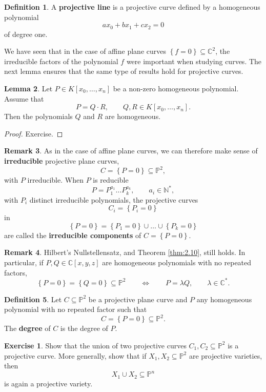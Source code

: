 \documentclass{article}
\newcommand{\N}{\mathbb{N}}
\newcommand{\C}{\mathbb{C}}
\renewcommand{\P}{\mathbb{P}}
\renewcommand{\sb}[1]{\left[ #1 \right]}
\newcommand{\cb}[1]{\left\{ #1 \right\}}
\theoremstyle{definition}\newtheorem{definition}{Definition}[section]
\theoremstyle{definition}\newtheorem{notation}[definition]{Notation}
\theoremstyle{definition}\newtheorem{remark}[definition]{Remark}
\theoremstyle{definition}\newtheorem{example1}[definition]{Example}
\theoremstyle{definition}\newtheorem{fact}{Fact}
\theoremstyle{definition}\newtheorem{exercise}{Exercise}
\theoremstyle{definition}\newtheorem*{example2}{Example}
\newtheorem{lemma}[definition]{Lemma}
\begin{document}
\begin{definition}
A \textbf{projective line} is a projective curve defined by a homogeneous polynomial
$$ ax_0 + bx_1 + cx_2 = 0 $$
of degree one.
\end{definition}

We have seen that in the case of affine plane curves $ \cb{f = 0} \subseteq \C^2 $, the irreducible factors of the polynomial $ f $ were important when studying curves. The next lemma ensures that the same type of results hold for projective curves.

\begin{lemma}
\label{lem:4.10}
Let $ P \in K\sb{x_0, \dots, x_n} $ be a non-zero homogeneous polynomial. Assume that
$$ P = Q \cdot R, \qquad Q, R \in K\sb{x_0, \dots, x_n}. $$
Then the polynomials $ Q $ and $ R $ are homogeneous.
\end{lemma}

\begin{proof}
Exercise.
\end{proof}

\begin{remark}
As in the case of affine plane curves, we can therefore make sense of \textbf{irreducible} projective plane curves,
$$ C = \cb{P = 0} \subseteq \P^2, $$
with $ P $ irreducible. When $ P $ is reducible
$$ P = P_1^{a_1} \dots P_k^{a_k}, \qquad a_i \in \N^*, $$
with $ P_i $ distinct irreducible polynomials, the projective curves
$$ C_i = \cb{P_i = 0} $$
in
$$ \cb{P = 0} = \cb{P_1 = 0} \cup \dots \cup \cb{P_k = 0} $$
are called the \textbf{irreducible components} of $ C = \cb{P = 0} $.
\end{remark}

\begin{remark}
\label{rem:4.12}
Hilbert's Nullstellensatz, and Theorem \ref{thm:2.10}, still holds. In particular, if $ P, Q \in \C\sb{x, y, z} $ are homogeneous polynomials with no repeated factors,
$$ \cb{P = 0} = \cb{Q = 0} \subseteq \P^2 \qquad \iff \qquad P = \lambda Q, \qquad \lambda \in \C^*. $$
\end{remark}

\begin{definition}
Let $ C \subseteq \P^2 $ be a projective plane curve and $ P $ any homogeneous polynomial with no repeated factor such that
$$ C = \cb{P = 0} \subseteq \P^2. $$
The \textbf{degree} of $ C $ is the degree of $ P $.
\end{definition}

\begin{exercise}
Show that the union of two projective curves $ C_1, C_2 \subseteq \P^2 $ is a projective curve. More generally, show that if $ X_1, X_2 \subseteq \P^2 $ are projective varieties, then
$$ X_1 \cup X_2 \subseteq \P^n $$
is again a projective variety.
\end{exercise}
\end{document}
